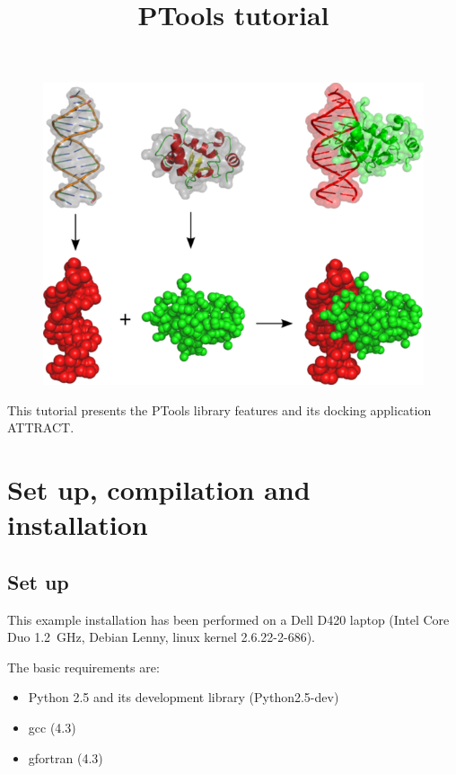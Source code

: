 \documentclass[12pt,a4paper]{article}
\begin{document}
\title{PTools tutorial}
\maketitle

\thispagestyle{empty}

\begin{figure}[htbp]
\center
\includegraphics*[width=0.80\linewidth]{img/docking.png}
\end{figure}


\vspace*{3cm}

\noindent
This tutorial presents the PTools library features and its docking application ATTRACT.

\newpage

\tableofcontents{}

\newpage

\section{Set up, compilation and installation}

\subsection{Set up}
This example installation has been performed on a Dell D420 laptop (Intel
Core Duo 1.2~GHz, Debian Lenny, linux kernel 2.6.22-2-686).

The basic requirements are:
\begin{itemize}
\item Python 2.5 and its development library (Python2.5-dev)
\item gcc (4.3)
\item gfortran (4.3)
\end{itemize}
\end{document}

